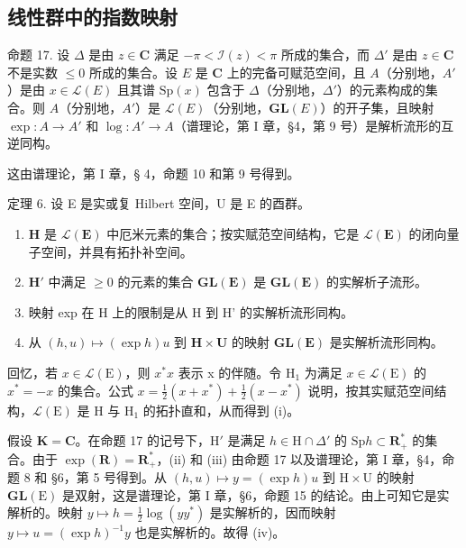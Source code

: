 \subsection{线性群中的指数映射}

命题 17. 设 \(\Delta\) 是由 \(z\in \mathbf{C}\) 满足 \(-\pi < \mathcal{I}(z) < \pi\) 所成的集合，而 \(\Delta'\) 是由 \(z\in \mathbf{C}\) 不是实数 \(\leqslant 0\) 所成的集合。设 \(E\) 是 \(\mathbf{C}\) 上的完备可赋范空间，且 \(A\)（分别地，\(A'\)）是由 \(x\in \mathcal{L}(E)\) 且其谱 \(\mathrm{Sp}(x)\) 包含于 \(\Delta\)（分别地，\(\Delta'\)）的元素构成的集合。则 \(A\)（分别地，\(A'\)）是 \(\mathcal{L}(E)\)（分别地，\(\mathbf{GL}(E)\)）的开子集，且映射 \(\exp: A\to A'\) 和 \(\log: A'\to A\)（谱理论，第 I 章，§4，第 9 号）是解析流形的互逆同构。

这由谱理论，第 I 章，§ 4，命题 10 和第 9 号得到。

定理 6. 设 E 是实或复 Hilbert 空间，U 是 E 的酉群。

\begin{enumerate}
\def\labelenumi{(\roman{enumi})}
\item
  \(\mathbf{H}\) 是 \(\mathcal{L}(\mathbf{E})\) 中厄米元素的集合；按实赋范空间结构，它是 \(\mathcal{L}(\mathbf{E})\) 的闭向量子空间，并具有拓扑补空间。
\item
  \(\mathbf{H}'\) 中满足 \(\geqslant 0\) 的元素的集合 \(\mathbf{GL}(\mathbf{E})\) 是 \(\mathbf{GL}(\mathbf{E})\) 的实解析子流形。
\item
  映射 exp 在 H 上的限制是从 H 到 H' 的实解析流形同构。
\item
  从 \((h,u)\mapsto (\exp h)u\) 到 \(\mathbf{H}\times \mathbf{U}\) 的映射 \(\mathbf{GL}(\mathbf{E})\) 是实解析流形同构。
\end{enumerate}

回忆，若 \(x \in \mathcal{L}(\mathrm{E})\)，则 \(x^*\)\(x\) 表示 x 的伴随。令 \(\mathrm{H}_1\) 为满足 \(x \in \mathcal{L}(\mathrm{E})\) 的 \(x^* = -x\) 的集合。公式 \(x = \frac{1}{2}(x + x^*) + \frac{1}{2}(x - x^*)\) 说明，按其实赋范空间结构，\(\mathcal{L}(\mathrm{E})\) 是 \(\mathrm{H}\) 与 \(\mathrm{H}_1\) 的拓扑直和，从而得到 (i)。

假设 \(\mathbf{K} = \mathbf{C}\)。在命题 17 的记号下，\(\mathrm{H}'\) 是满足 \(h \in \mathrm{H} \cap \Delta'\) 的 \(\mathrm{Sp} h \subset \mathbf{R}_{+}^{*}\) 的集合。由于 \(\exp(\mathbf{R}) = \mathbf{R}_{+}^{*}\)，(ii) 和 (iii) 由命题 17 以及谱理论，第 I 章，§4，命题 8 和 §6，第 5 号得到。从 \((h, u) \mapsto y = (\exp h)u\) 到 \(\mathrm{H} \times \mathrm{U}\) 的映射 \(\mathbf{GL}(\mathrm{E})\) 是双射，这是谱理论，第 I 章，§6，命题 15 的结论。由上可知它是实解析的。映射 \(y \mapsto h = \frac{1}{2} \log(yy^*)\) 是实解析的，因而映射 \(y \mapsto u = (\exp h)^{-1}y\) 也是实解析的。故得 (iv)。

